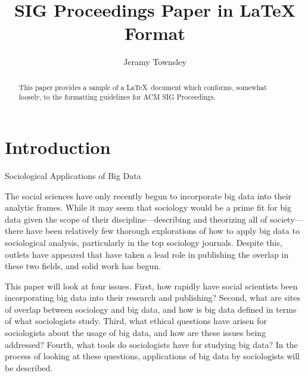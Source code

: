 \documentclass[sigconf]{acmart}
\begin{document}
\title{SIG Proceedings Paper in LaTeX Format}


\author{Jeramy Townsley}


\renewcommand{\shortauthors}{B. Trovato et al.}


\begin{abstract}
This paper provides a sample of a \LaTeX\ document which conforms,
somewhat loosely, to the formatting guidelines for
ACM SIG Proceedings.
\end{abstract}



\maketitle

\section{Introduction}

Sociological Applications of Big Data

The social sciences have only recently begun to incorporate big data into their analytic frames.  While it may seem that sociology would be a prime fit for big data given the scope of their discipline—describing and theorizing all of society—there have been relatively few thorough explorations of how to apply big data to sociological analysis, particularly in the top sociology journals.  Despite this, outlets have appeared that have taken a lead role in publishing the overlap in these two fields, and solid work has begun. 

This paper will look at four issues.  First, how rapidly have social scientists been incorporating big data into their research and publishing?  Second, what are sites of overlap between sociology and big data, and how is big data defined in terms of what sociologists study.  Third,  what ethical questions have arisen for sociologists about the usage of big data, and how are these issues being addressed?  Fourth, what tools do sociologists have for studying big data?  In the process of looking at these questions, applications of big data by sociologists will be described.
\end{document}
